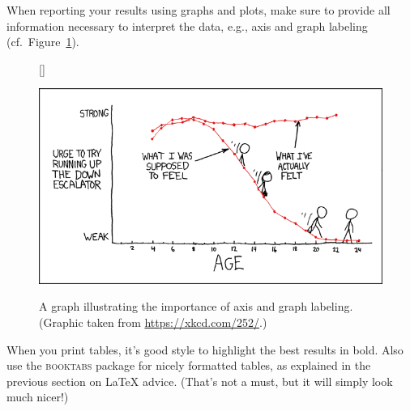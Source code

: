 When reporting your results using graphs and plots, make sure to provide all information necessary to interpret the data, e.g., axis and graph labeling (cf.~Figure~\ref{fig:xkcd}).

  \begin{figure}[bh!]
  [\FBwidth]
  {\caption{A graph illustrating the importance of axis and graph labeling. (Graphic taken from \url{https://xkcd.com/252/}.)\label{fig:xkcd}}}
  {\includegraphics[width=.45\textwidth]{figures/escalators.png}}
  \end{figure}

When you print tables, it's good style to highlight the best results in bold. Also use the \textsc{booktabs} package for nicely formatted tables, as explained in the previous section on \LaTeX{} advice. (That's not a must, but it will simply look much nicer!)